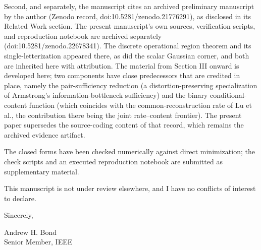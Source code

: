 \documentclass[11pt]{article}
\begin{document}
Second, and separately, the manuscript cites an archived preliminary
manuscript by the author (Zenodo record, doi:10.5281/zenodo.21776291), as
disclosed in its Related Work section. The present manuscript's own sources,
verification scripts, and reproduction notebook are archived separately
(doi:10.5281/zenodo.22678341). The discrete operational
region theorem and its single-letterization appeared there, as did the
scalar Gaussian corner, and both are inherited here with attribution.
The material from Section III onward is developed here; two components have
close predecessors that are credited in place, namely the pair-sufficiency
reduction (a distortion-preserving specialization of Armstrong's
information-bottleneck sufficiency) and the binary conditional-content
function (which coincides with the common-reconstruction rate of Lu et al.,
the contribution there being the joint rate--content frontier). The present
paper supersedes the source-coding content of that record, which remains the
archived evidence artifact.

The closed forms have been checked numerically against direct
minimization; the check scripts and an executed reproduction notebook are
submitted as supplementary material.

This manuscript is not under review elsewhere, and I have no conflicts of
interest to declare.

Sincerely,

Andrew H. Bond\\
Senior Member, IEEE
\end{document}
